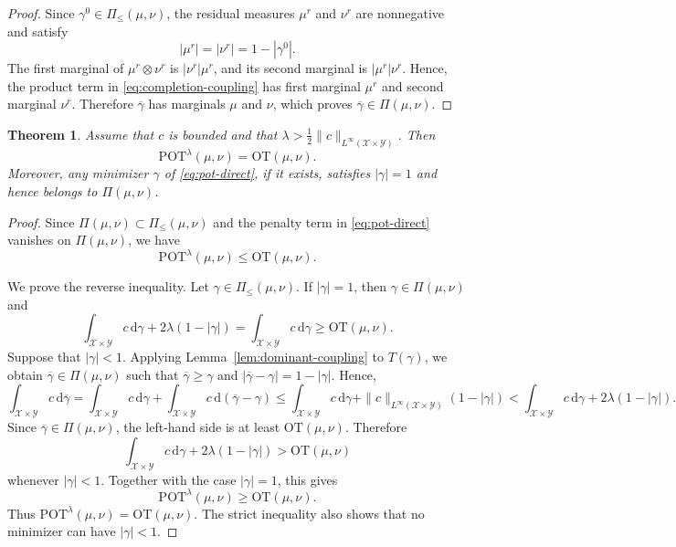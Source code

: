 \documentclass[a4paper,11pt]{article}
\numberwithin{equation}{section}
\newtheorem{thm}{Theorem}[section]
\newcommand{\OT}{\mathrm{OT}}
\newcommand{\POT}{\mathrm{POT}}
\newcommand{\dd}{\,\mathrm{d}}
\newcommand{\X}{\mathcal{X}}
\newcommand{\Y}{\mathcal{Y}}
\begin{document}
\begin{proof}
Since $\gamma^0 \in \Pi_{\leq}(\mu,\nu)$, the residual measures $\mu^r$ and $\nu^r$ are nonnegative and satisfy
\begin{equation*}
  |\mu^r| = |\nu^r| = 1 - |\gamma^0|.
\end{equation*}
The first marginal of $\mu^r\otimes\nu^r$ is $|\nu^r|\mu^r$, and its second marginal is $|\mu^r|\nu^r$. Hence, the product term in \eqref{eq:completion-coupling} has first marginal $\mu^r$ and second marginal $\nu^r$. Therefore $\overline\gamma$ has marginals $\mu$ and $\nu$, which proves $\overline\gamma \in \Pi(\mu,\nu)$.
\end{proof}

\begin{thm}\label{thm:lambda-to-infty}
Assume that $c$ is bounded and that
$\lambda > \frac12\|c\|_{L^\infty(\X\times\Y)}$. Then
\begin{equation*}
  \POT^{\lambda}(\mu,\nu) = \OT(\mu,\nu).
\end{equation*}
Moreover, any minimizer $\gamma$ of \eqref{eq:pot-direct}, if it exists, satisfies $|\gamma|=1$ and hence belongs to $\Pi(\mu,\nu)$.
\end{thm}

\begin{proof}
Since $\Pi(\mu,\nu)\subset \Pi_{\leq}(\mu,\nu)$ and the penalty term in \eqref{eq:pot-direct} vanishes on $\Pi(\mu,\nu)$, we have
\begin{equation*}
  \POT^{\lambda}(\mu,\nu) \leq \OT(\mu,\nu).
\end{equation*}

We prove the reverse inequality. Let $\gamma \in \Pi_{\leq}(\mu,\nu)$. If $|\gamma|=1$, then $\gamma \in \Pi(\mu,\nu)$ and
\begin{equation*}
  \int_{\X\times\Y} c\dd\gamma + 2\lambda(1-|\gamma|) = \int_{\X\times\Y} c\dd\gamma \geq \OT(\mu,\nu).
\end{equation*}
Suppose that $|\gamma|<1$. Applying Lemma~\ref{lem:dominant-coupling} to $T(\gamma)$, we obtain $\overline\gamma \in \Pi(\mu,\nu)$ such that $\overline\gamma \geq \gamma$ and $|\overline\gamma-\gamma|=1-|\gamma|$. 
Hence,
\begin{equation*}
  \int_{\X\times\Y} c\dd\overline\gamma = \int_{\X\times\Y} c\dd\gamma + \int_{\X\times\Y} c\dd(\overline\gamma-\gamma) \leq \int_{\X\times\Y} c\dd\gamma + \|c\|_{L^\infty(\X\times\Y)}(1-|\gamma|) < \int_{\X\times\Y} c\dd\gamma + 2\lambda(1-|\gamma|).
\end{equation*}
Since $\overline\gamma \in \Pi(\mu,\nu)$, the left-hand side is at least $\OT(\mu,\nu)$. Therefore
\begin{equation*}
  \int_{\X\times\Y} c\dd\gamma + 2\lambda(1-|\gamma|) > \OT(\mu,\nu)
\end{equation*}
whenever $|\gamma|<1$. Together with the case $|\gamma|=1$, this gives
\begin{equation*}
  \POT^{\lambda}(\mu,\nu) \geq \OT(\mu,\nu).
\end{equation*}
Thus $\POT^{\lambda}(\mu,\nu)=\OT(\mu,\nu)$. The strict inequality also shows that no minimizer can have $|\gamma|<1$.
\end{proof}
\end{document}
